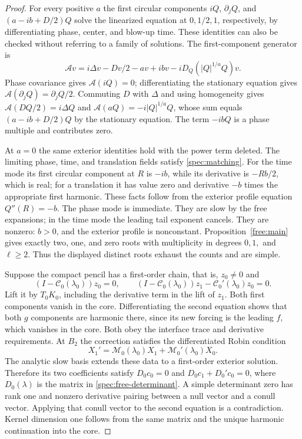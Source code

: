 \begin{proof}
For every positive $a$ the first circular components
$iQ$, $\partial_jQ$, and $(a-ib+D/2)Q$ solve the linearized equation
at $0,1/2,1$, respectively, by differentiating phase, center, and
blow-up time. These identities can also be checked without referring
to a family of solutions. The first-component generator is
\[
 \mathcal A v=i\Delta v-Dv/2-av+ibv-iD_Q(|Q|^{1/a}Q)v.
\]
Phase covariance gives $\mathcal A(iQ)=0$; differentiating the
stationary equation gives $\mathcal A(\partial_jQ)=\partial_jQ/2$.
Commuting $D$ with $\Delta$ and using homogeneity gives
$\mathcal A(DQ/2)=i\Delta Q$ and
$\mathcal A(aQ)=-i|Q|^{1/a}Q$, whose sum equals
$(a-ib+D/2)Q$ by the stationary equation. The term $-ibQ$ is a phase
multiple and contributes zero.

At $a=0$ the same exterior identities hold with the power term
deleted. The limiting phase, time, and translation fields satisfy
\eqref{spec:matching}. For the time mode its first circular component
at $R$ is $-ib$, while its derivative is $-Rb/2$, which is real;
for a translation it has value zero and derivative $-b$ times the
appropriate first harmonic. These facts follow from the exterior
profile equation $Q''(R)=-b$. The phase mode is immediate.
They are slow by the free expansions; in the time mode the leading
tail exponent cancels. They are nonzero: $b>0$, and the exterior
profile is nonconstant. Proposition~\ref{free:main} gives exactly
two, one, and zero roots with multiplicity in degrees $0,1,$ and
$\ell\ge2$. Thus the displayed distinct roots exhaust the counts
and are simple.

Suppose the compact pencil has a first-order chain, that is,
$z_0\ne0$ and
\[
 (I-\mathcal C_0(\lambda_0))z_0=0,\qquad
 (I-\mathcal C_0(\lambda_0))z_1
       -\mathcal C_0'(\lambda_0)z_0=0.
\]
Lift it by $T_0K_0$, including the derivative term in the lift of
$z_1$. Both first components vanish in the core. Differentiating the
second equation shows that both $g$ components are harmonic there,
since its new forcing is the leading $f$, which vanishes in the core.
Both obey the interface trace and derivative requirements. At $B_2$
the correction satisfies the differentiated Robin condition
\[
 X_1'=\mathcal M_0(\lambda_0)X_1
                 +\mathcal M_0'(\lambda_0)X_0.
\]
The analytic slow basis extends these data to a first-order exterior
solution. Therefore its two coefficients satisfy
$D_0c_0=0$ and $D_0c_1+D_0'c_0=0$, where $D_0(\lambda)$ is the
matrix in \eqref{spec:free-determinant}. A simple determinant zero
has rank one and nonzero derivative pairing between a null vector
and a conull vector. Applying that conull vector to the second
equation is a contradiction. Kernel dimension one follows from the
same matrix and the unique harmonic continuation into the core.
\end{proof}

